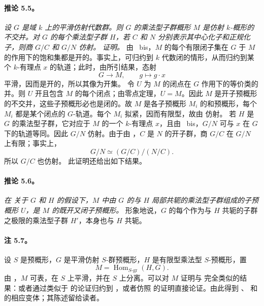 \paragraph{\textbf{推论 5.5。}}
\emph{设 \(G\) 是域 \(k\) 上的平滑仿射代数群。则 \(G\) 的乘法型子群概形 \(M\) 是仿射 \(k\)-概形的不交并。对 \(G\) 的每个乘法型子群 \(H\)，若 \(C\) 和 \(N\) 分别表示其中心化子和正规化子，则商 \(G/C\) 和 \(G/N\) 仿射。}
\emph{证明。}
由 ~bis，\(M\) 的每个有限闭子集在 \(G\) 于 \(M\) 的作用下的饱和集都是开的。事实上，可归约到 \(k\) 代数闭的情形，从而归约到某个 \(k\)-有理点 \(x\) 的轨道；此时，由所引结果，态射
\[
  G\longrightarrow M,\qquad g\longmapsto g\cdot x
\]
平滑，因而是开的，所以其像为开集。
令 \(U\) 为 \(M\) 的闭点在 \(G\) 作用下的等价类的并。则 \(U\) 开且包含 \(M\) 的每个闭点；由零点定理，\(U=M\)。因此 \(M\) 是开子预概形的不交并，这些子预概形必也是闭的。故 \(M\) 是各子预概形 \(M_i\) 的和预概形，每个 \(M_i\) 都是某个闭点的 \(G\)-轨道。每个 \(M_i\) 拟紧，因而有限型，故由  仿射。
若 \(H\) 是 \(G\) 的乘法型子群，它对应于 \(M\) 的一个 \(k\)-有理点 \(x\)，且由 ~bis，\(G/N\) 可与 \(x\) 在 \(G\) 下的轨道等同。因此 \(G/N\) 仿射。由于由 ，\(C\) 是 \(N\) 的开子群，商 \(G/C\) 在 \(G/N\) 上有限；事实上，
\[
  G/N\simeq (G/C)/(N/C).
\]
所以 \(G/C\) 也仿射。
此证明还给出如下结果。
\paragraph{\textbf{推论 5.6。}}
\emph{在  关于 \(G\) 和 \(H\) 的假设下，\(M\) 中由 \(G\) 的与 \(H\) 局部共轭的乘法型子群组成的子预概形 \(U\)，是 \(M\) 的既开又闭子预概形。}
形象地说，\(G\) 的每个作为与 \(H\) 共轭的子群之极限的乘法型子群 \(H'\)，本身也与 \(H\) 共轭。
\paragraph{\textbf{注 5.7。}}
设 \(S\) 是预概形，\(G\) 是平滑仿射 \(S\)-群预概形，\(H\) 是有限型乘法型 \(S\)-预概形，置
\[
  M=\operatorname{Hom}_{S\text{-gr}}(H,G).
\]
由 ，\(M\) 可表，在 \(S\) 上平滑，并在 \(S\) 上分离。可以对 \(M\) 证明与  完全类似的结果：或者通过类似于  的论证归约到 ，或者仿照  的证明直接论证。由此得到 、 和  的相应变体；其陈述留给读者。
